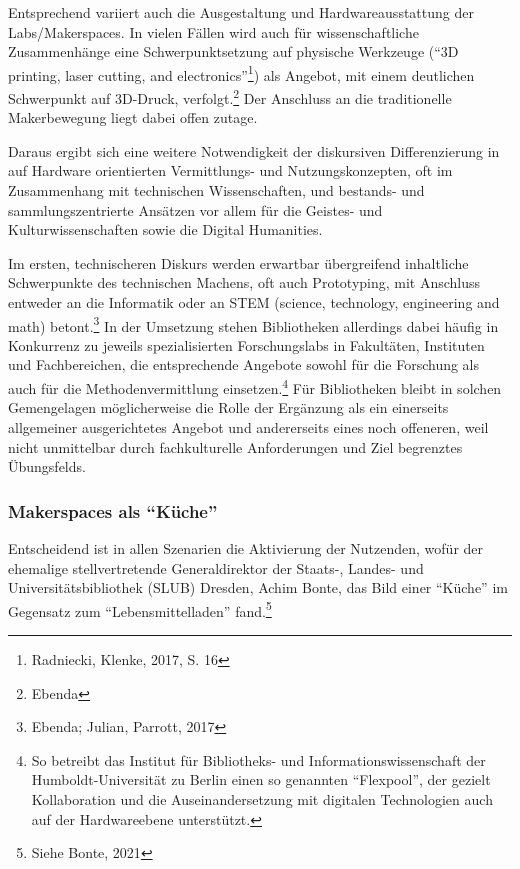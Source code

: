 \documentclass[a4paper,
fontsize=11pt,
oneside,
numbers=noperiodatend,
parskip=half-,
bibliography=totoc,
final
]{scrartcl}
\begin{document}
Entsprechend variiert auch die Ausgestaltung und Hardwareausstattung der
Labs/Makerspaces. In vielen Fällen wird auch für wissenschaftliche
Zusammenhänge eine Schwerpunktsetzung auf physische Werkzeuge
(\enquote{3D printing, laser cutting, and electronics}\footnote{Radniecki,
  Klenke, 2017, S. 16}) als Angebot, mit einem deutlichen Schwerpunkt
auf 3D-Druck, verfolgt.\footnote{Ebenda} Der Anschluss an die
traditionelle Makerbewegung liegt dabei offen zutage.

Daraus ergibt sich eine weitere Notwendigkeit der diskursiven
Differenzierung in auf Hardware orientierten Vermittlungs- und
Nutzungskonzepten, oft im Zusammenhang mit technischen Wissenschaften,
und bestands- und sammlungszentrierte Ansätzen vor allem für die
Geistes- und Kulturwissenschaften sowie die Digital Humanities.

Im ersten, technischeren Diskurs werden erwartbar übergreifend
inhaltliche Schwerpunkte des technischen Machens, oft auch Prototyping,
mit Anschluss entweder an die Informatik oder an STEM (science,
technology, engineering and math) betont.\footnote{Ebenda; Julian,
  Parrott, 2017} In der Umsetzung stehen Bibliotheken allerdings dabei
häufig in Konkurrenz zu jeweils spezialisierten Forschungslabs in
Fakultäten, Instituten und Fachbereichen, die entsprechende Angebote
sowohl für die Forschung als auch für die Methodenvermittlung
einsetzen.\footnote{So betreibt das Institut für Bibliotheks- und
  Informationswissenschaft der Humboldt-Universität zu Berlin einen so
  genannten \enquote{Flexpool}, der gezielt Kollaboration und die
  Auseinandersetzung mit digitalen Technologien auch auf der
  Hardwareebene unterstützt.} Für Bibliotheken bleibt in solchen
Gemengelagen möglicherweise die Rolle der Ergänzung als ein einerseits
allgemeiner ausgerichtetes Angebot und andererseits eines noch
offeneren, weil nicht unmittelbar durch fachkulturelle Anforderungen und
Ziel begrenztes Übungsfelds.

\hypertarget{makerspaces-als-kuxfcche}{%
\subsubsection{\texorpdfstring{Makerspaces als
\enquote{Küche}}{Makerspaces als ``Küche''}}\label{makerspaces-als-kuxfcche}}

Entscheidend ist in allen Szenarien die Aktivierung der Nutzenden, wofür
der ehemalige stellvertretende Generaldirektor der Staats-, Landes- und
Universitätsbibliothek (SLUB) Dresden, Achim Bonte, das Bild einer
\enquote{Küche} im Gegensatz zum \enquote{Lebensmittelladen}
fand.\footnote{Siehe Bonte, 2021}
\end{document}
